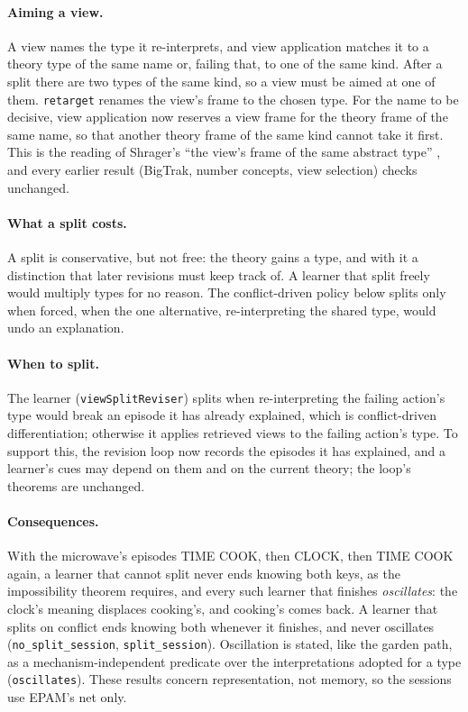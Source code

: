 \documentclass[11pt]{article}
\newcommand{\code}[1]{\texttt{#1}}
\newcommand{\lean}[1]{\texttt{#1}}
\begin{document}
\paragraph{Aiming a view.} A view names the type it re-interprets, and view application matches it to a theory type of the same name or, failing that, to one of the same kind. After a split there are two types of the same kind, so a view must be aimed at one of them. \code{retarget} renames the view's frame to the chosen type. For the name to be decisive, view application now reserves a view frame for the theory frame of the same name, so that another theory frame of the same kind cannot take it first. This is the reading of Shrager's ``the view's frame of the same abstract type'' \citep{shrager1987}, and every earlier result (BigTrak, number concepts, view selection) checks unchanged.

\paragraph{What a split costs.} A split is conservative, but not free: the theory gains a type, and with it a distinction that later revisions must keep track of. A learner that split freely would multiply types for no reason. The conflict-driven policy below splits only when forced, when the one alternative, re-interpreting the shared type, would undo an explanation.

\paragraph{When to split.} The learner (\code{viewSplitReviser}) splits when re-interpreting the failing action's type would break an episode it has already explained, which is conflict-driven differentiation; otherwise it applies retrieved views to the failing action's type. To support this, the revision loop now records the episodes it has explained, and a learner's cues may depend on them and on the current theory; the loop's theorems are unchanged.

\paragraph{Consequences.} With the microwave's episodes TIME COOK, then CLOCK, then TIME COOK again, a learner that cannot split never ends knowing both keys, as the impossibility theorem requires, and every such learner that finishes \emph{oscillates}: the clock's meaning displaces cooking's, and cooking's comes back. A learner that splits on conflict ends knowing both whenever it finishes, and never oscillates (\lean{no\_split\_session}, \lean{split\_session}). Oscillation is stated, like the garden path, as a mechanism-independent predicate over the interpretations adopted for a type (\code{oscillates}). These results concern representation, not memory, so the sessions use EPAM's net only.
\end{document}
